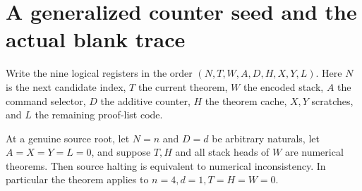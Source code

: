 \section{A generalized counter seed and the actual blank trace}
\label{sec:seed}
Write the nine logical registers in the order
$(N,T,W,A,D,H,X,Y,L)$. Here $N$ is the next candidate index, $T$ the current theorem, $W$ the encoded stack, $A$ the command selector, $D$ the additive counter, $H$ the theorem cache, $X,Y$ scratches, and $L$ the remaining proof-list code.

\begin{theorem}
At a genuine source root, let $N=n$ and $D=d$ be arbitrary naturals, let $A=X=Y=L=0$, and suppose $T,H$ and all stack heads of $W$ are numerical theorems. Then source halting is equivalent to numerical inconsistency. In particular the theorem applies to $n=4,d=1,T=H=W=0$.
\end{theorem}
